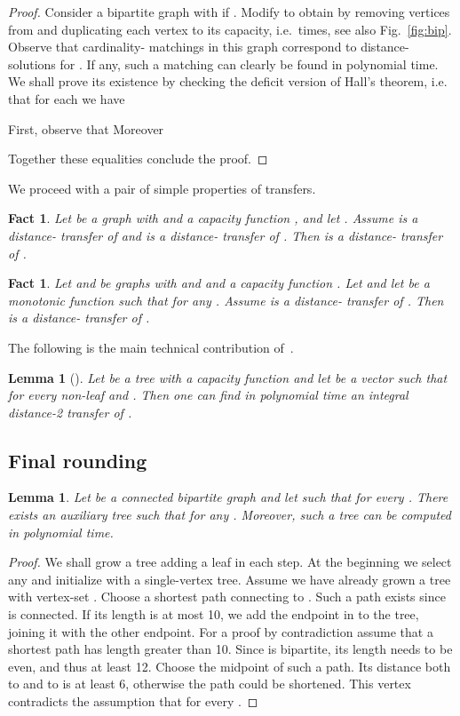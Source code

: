 \documentclass{article}
\theoremstyle{plain}
\newtheorem{lemma}[theorem]{Lemma}
\newtheorem{fact}[theorem]{Fact}
\theoremstyle{definition}
\begin{document}
\begin{proof}
Consider a bipartite graph  with  if . Modify  to obtain  by removing vertices from 
and duplicating each vertex  to its capacity, i.e.\  times, see
also Fig.~\ref{fig:bip}.
Observe that cardinality- matchings in this graph correspond to
distance- solutions for . 
If any, such a matching can clearly be found in polynomial time.
We shall prove its existence by checking the deficit version of Hall's theorem,
i.e. that for each  we have 

First, observe that 
Moreover

Together these equalities conclude the proof.
\end{proof}

We proceed with a pair of simple properties of transfers. 
\begin{fact}\label{fct:comp}
Let  be a graph with  and a capacity function , and let .
Assume  is a distance- transfer of 
and  is a distance- transfer of . Then  is a
distance- transfer of .
\end{fact}
\begin{fact}\label{fct:image}
Let  and  be graphs with  and  and a
capacity function . Let  and let  be a monotonic function such that  for any
.
Assume  is a distance- transfer of . Then  is a
distance- transfer of .
\end{fact}

The following is the main technical contribution
of~\cite{svensson}.

\begin{lemma}[\cite{svensson}]\label{lem:tree}
Let  be a tree with a capacity function  and let  be a vector such that  for every non-leaf  and
.
Then one can find in polynomial time an integral 
distance-2 transfer of .
\end{lemma}

\subsection{Final rounding}
\label{ssec:tree-rounding}

\begin{lemma}
\label{lem:build-tree}
Let  be a connected bipartite graph
and let  such that  for every .
There exists an auxiliary tree  
such that  for any .
Moreover, such a tree can be computed in polynomial time.
\end{lemma}
\begin{proof}
We shall grow a tree adding a leaf in each step.
At the beginning we select any  and initialize with a single-vertex
tree.
Assume we have already grown a tree with vertex-set .
Choose a shortest path connecting  to . Such a path exists since
 is connected. If its length is at most 10, we add the endpoint in
 to the tree, joining it with the other endpoint.
For a proof by contradiction assume that a shortest path has length greater than
10. Since  is bipartite, its length needs to be even, and thus at least 12.
Choose the midpoint of such a path. Its distance both
to  and to  is at least 6, otherwise the path could be shortened.
This vertex contradicts the assumption that  for every .
\end{proof}
\end{document}
